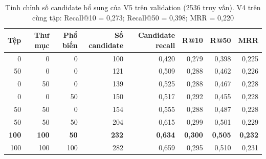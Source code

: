 \begin{table}[htbp]
\centering
\caption[Tinh chỉnh số candidate bổ sung của V5]{Tinh chỉnh số candidate bổ sung của V5 trên validation  (\num{2536} truy vấn). V4 trên cùng tập: Recall@10 = 0,273; Recall@50 = 0,398; MRR = 0,220}\label{tab:v5grid}
\begin{tabular}{@{}rrrrrrrr@{}}
\toprule
Tệp & Thư mục & Phổ biến & Số candidate & Candidate recall & R@10 & R@50 & MRR \\
\midrule
0 & 0 & 0 & 100 & 0,420 & 0,279 & 0,398 & 0,225 \\
50 & 0 & 0 & 121 & 0,509 & 0,288 & 0,462 & 0,226 \\
0 & 50 & 0 & 139 & 0,525 & 0,288 & 0,467 & 0,228 \\
0 & 0 & 50 & 150 & 0,517 & 0,292 & 0,455 & 0,228 \\
50 & 50 & 0 & 154 & 0,555 & 0,288 & 0,487 & 0,228 \\
50 & 50 & 50 & 204 & 0,615 & 0,299 & 0,501 & 0,229 \\
\textbf{100} & \textbf{100} & \textbf{50} & \textbf{232} & \textbf{0,634} & \textbf{0,300} & \textbf{0,505} & \textbf{0,232} \\
100 & 100 & 100 & 282 & 0,659 & 0,295 & 0,510 & 0,231 \\
\bottomrule
\end{tabular}
\end{table}
